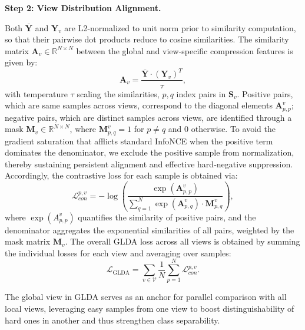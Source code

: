 \documentclass[10pt, journal, compsoc]{IEEEtran}
\newif\ifshowrevision
\newenvironment{revpar}{%
  \ifshowrevision
    \color{blue}%
  \fi
}{}
\begin{document}
\textbf{Step 2: View Distribution Alignment.} \begin{revpar} Both $\overline{\mathbf{Y}}$ and $\mathbf{Y}_{v}$ are L2-normalized to unit norm prior to similarity computation, so that their pairwise dot products reduce to cosine similarities. The similarity matrix $\mathbf{A}_{v}\in\mathbb{R}^{N\times N}$ between the global and view-specific compression features is given by: \end{revpar}
\begin{equation}
\boldsymbol{A}_{v}= \frac{\overline{\boldsymbol{Y}}\cdot (\boldsymbol{Y}_{v})^{T}}{\tau},
\end{equation}
with temperature $\tau$ scaling the similarities, $p,q$ index pairs in $\boldsymbol{S}_v$. Positive pairs, which are same samples across views, correspond to the diagonal elements $\boldsymbol{A}_{p,p}^v$; negative pairs, which are distinct samples across views, are identified through a mask $\boldsymbol{M}_v\in\mathbb{R}^{N\times N}$, where $\boldsymbol{M}_{p,q}^v=1$ for $p\neq q$ and $0$ otherwise.
To avoid the gradient saturation that afflicts standard InfoNCE when the positive term dominates the denominator, we exclude the positive sample from normalization, thereby sustaining persistent alignment and effective hard‑negative suppression.
Accordingly, the contrastive loss for each sample is obtained via:
\begin{equation}
  \mathcal{L}_{con}^{p,v}= -\log \left(\frac{\exp(\boldsymbol{A}_{p,p}^{v})}{\sum_{q=1}^{N}\exp(\boldsymbol{A}_{p,q}^{v})
  \cdot \boldsymbol{M}_{p,q}^{v}}\right),
\end{equation}
where $\exp(A_{p,p}^{v})$ quantifies the similarity of positive pairs, and the denominator aggregates the exponential similarities of all pairs, weighted by the mask matrix $\boldsymbol{M}_{v}$. The overall GLDA loss across all views is obtained by summing the individual losses for each view and averaging over samples:
\begin{equation}
  \mathcal{L}_{\text{GLDA}}= \sum_{v\in\mathcal{V}}\frac{1}{N}\sum_{p=1}^{N}\mathcal{L}_{con}^{p,v}. \label{eq:GLDA}
\end{equation}

The global view in GLDA serves as an anchor for parallel comparison with all local views, leveraging easy samples from one view to boost distinguishability of hard ones in another and thus strengthen class separability.
\end{document}
